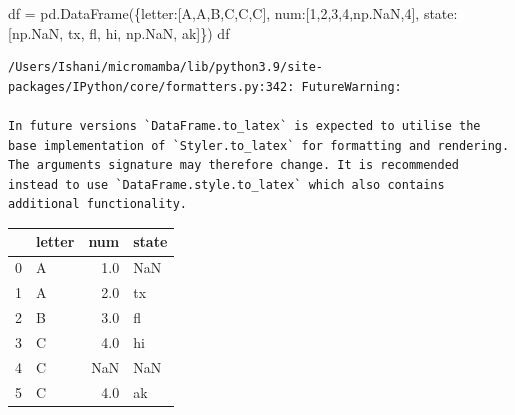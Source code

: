 \documentclass[
  letterpaper,
  DIV=11,
  numbers=noendperiod]{scrreprt}
\newenvironment{Shaded}{\begin{snugshade}}{\end{snugshade}}
\newcommand{\DecValTok}[1]{\textcolor[rgb]{0.68,0.00,0.00}{#1}}
\newcommand{\NormalTok}[1]{\textcolor[rgb]{0.00,0.23,0.31}{#1}}
\newcommand{\OperatorTok}[1]{\textcolor[rgb]{0.37,0.37,0.37}{#1}}
\newcommand{\StringTok}[1]{\textcolor[rgb]{0.13,0.47,0.30}{#1}}
\begin{document}
\begin{Shaded}
\begin{Highlighting}[]
\NormalTok{df }\OperatorTok{=}\NormalTok{ pd.DataFrame(\{}\StringTok{\textquotesingle{}letter\textquotesingle{}}\NormalTok{:[}\StringTok{\textquotesingle{}A\textquotesingle{}}\NormalTok{,}\StringTok{\textquotesingle{}A\textquotesingle{}}\NormalTok{,}\StringTok{\textquotesingle{}B\textquotesingle{}}\NormalTok{,}\StringTok{\textquotesingle{}C\textquotesingle{}}\NormalTok{,}\StringTok{\textquotesingle{}C\textquotesingle{}}\NormalTok{,}\StringTok{\textquotesingle{}C\textquotesingle{}}\NormalTok{], }
                   \StringTok{\textquotesingle{}num\textquotesingle{}}\NormalTok{:[}\DecValTok{1}\NormalTok{,}\DecValTok{2}\NormalTok{,}\DecValTok{3}\NormalTok{,}\DecValTok{4}\NormalTok{,np.NaN,}\DecValTok{4}\NormalTok{], }
                   \StringTok{\textquotesingle{}state\textquotesingle{}}\NormalTok{:[np.NaN, }\StringTok{\textquotesingle{}tx\textquotesingle{}}\NormalTok{, }\StringTok{\textquotesingle{}fl\textquotesingle{}}\NormalTok{, }\StringTok{\textquotesingle{}hi\textquotesingle{}}\NormalTok{, np.NaN, }\StringTok{\textquotesingle{}ak\textquotesingle{}}\NormalTok{]\})}
\NormalTok{df}
\end{Highlighting}
\end{Shaded}

\begin{verbatim}
/Users/Ishani/micromamba/lib/python3.9/site-packages/IPython/core/formatters.py:342: FutureWarning:

In future versions `DataFrame.to_latex` is expected to utilise the base implementation of `Styler.to_latex` for formatting and rendering. The arguments signature may therefore change. It is recommended instead to use `DataFrame.style.to_latex` which also contains additional functionality.
\end{verbatim}

\begin{tabular}{llrl}
\toprule
{} & letter &  num & state \\
\midrule
0 &      A &  1.0 &   NaN \\
1 &      A &  2.0 &    tx \\
2 &      B &  3.0 &    fl \\
3 &      C &  4.0 &    hi \\
4 &      C &  NaN &   NaN \\
5 &      C &  4.0 &    ak \\
\bottomrule
\end{tabular}
\end{document}
